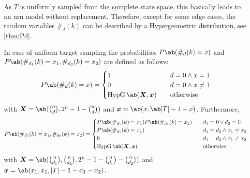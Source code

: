 As $T$ is uniformly sampled from the complete state space, this basically leads to an urn model without replacement. Therefore, except for some edge cases, the random variables $\#_d (k)$ can be described by a Hypergeometric distribution, see \cref{thm:Pd}.
\begin{widetext}
\begin{lemma}
    \label{thm:Pd}
    In case of uniform target sampling the probabilities $P\ab(\#_d (k) = x)$ and $P\ab(\#_{d_1} (k) = x_1, \#_{d_2} (k) = x_2)$ are defined as follows:
    \begin{equation}
        \label{eq:Pd}
        P\ab(\#_d (k) = x) = 
        \begin{cases}
            1 &\quad d = 0 \wedge x = 1 \\
            0 &\quad d = 0 \wedge x \neq 1 \\
            \hypgeom \ab(\bm{X}, \bm{x}) &\quad \text{otherwise}
        \end{cases}
    \end{equation}
    with $\bm{X} = \ab(\binom{n}{d}, 2^n - 1 - \binom{n}{d})$ and $\bm{x} = \ab(x, \ab|T| - 1 - x)$. Furthermore, 
    \begin{equation}
        \label{eq:Pd1d2}
        P\ab(\#_{d_1} (k) = x_1, \#_{d_2} (k) = x_2) = \begin{cases}
            P\ab(\#_{d_1} (k) = x_1) P\ab(\#_{d_2} (k) = x_2) &\quad d_1 = 0 \vee d_2 = 0 \\
            P\ab(\#_{d_1} (k) = x_1) &\quad d_1 = d_2 \wedge x_1 = x_2 \\
            0 &\quad d_1 = d_2 \wedge x_1 \neq x_2 \\
            \hypgeom \ab(\bm{X}, \bm{x}) &\quad \text{otherwise}
        \end{cases}
    \end{equation}
    with $\bm{X} = \ab(\binom{n}{d_1}, \binom{n}{d_2}, 2^n - 1 - \binom{n}{d_1} - \binom{n}{d_2})$ and $\bm{x} = \ab(x_1, x_1, |T| - 1 - x_1 - x_2)$.
\end{lemma}
\end{widetext}

